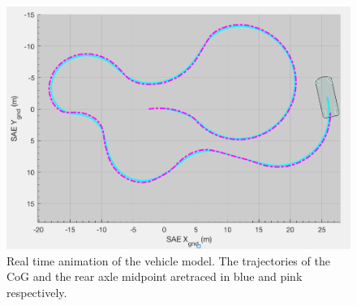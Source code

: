 \begin{figure}[htb]
    \centering
    \includegraphics[scale=0.5]{images/2danimation.png}
    \caption{Real time animation of the vehicle model. The trajectories of the CoG and the rear axle midpoint aretraced in blue and pink respectively.}
	\label{animfig}
\end{figure}

